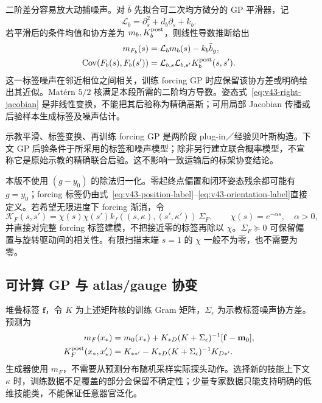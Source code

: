 \documentclass[11pt,a4paper]{article}
\numberwithin{equation}{section}
\theoremstyle{definition}
\begin{document}
二阶差分容易放大动捕噪声。对 $\bar b$ 先拟合可二次均方微分的 GP 平滑器，记
\begin{equation}
 \mathcal L_b=\partial_s^2+d_b\partial_s+k_b.
\end{equation}
若平滑后的条件均值和协方差为 $m_b,K_b^{\rm post}$，则线性导数推断给出
\begin{align}
 m_{F_b}(s)&=\mathcal L_bm_b(s)-k_b\bar b_g,\\
 \operatorname{Cov}(F_b(s),F_b(s'))
 &=\mathcal L_{b,s}\mathcal L_{b,s'}K_b^{\rm post}(s,s').
 \label{eq:v43-derivative-noise}
\end{align}
这一标签噪声在邻近相位之间相关，训练 forcing GP 时应保留该协方差或明确给出其近似。Mat\'ern $5/2$ 核满足本段所需的二阶均方导数。姿态式~\eqref{eq:v43-right-jacobian} 是非线性变换，不能把其后验称为精确高斯；可用局部 Jacobian 传播或后验样本生成标签及噪声估计。

示教平滑、标签变换、再训练 forcing GP 是两阶段 plug-in／经验贝叶斯构造。下文 GP 后验条件于所采用的标签和噪声模型；除非另行建立联合概率模型，不宣称它是原始示教的精确联合后验。这不影响一致运输后的标架协变结论。

本版不使用 $(g-y_0)$ 的除法归一化。零起终点偏置和闭环姿态残余都可能有 $g=y_0$；forcing 标签仍由式~\eqref{eq:v43-position-label}--\eqref{eq:v43-orientation-label}直接定义。若希望无限进度下 forcing 渐消，令
\begin{equation}
 \mathcal K_F(s,s')=\chi(s)\chi(s')k_f((s,\kappa),(s',\kappa'))\,\Sigma_F,
 \qquad \chi(s)=e^{-\alpha s},\quad\alpha>0,
 \label{eq:v43-gated-kernel}
\end{equation}
并直接对完整 forcing 标签建模，不把接近零的标签再除以 $\chi$。$\Sigma_F\succeq0$ 可保留偏置与旋转驱动间的相关性。有限扫描末端 $s=1$ 的 $\chi$ 一般不为零，也不需要为零。

\subsection{可计算 GP 与 atlas/gauge 协变}
堆叠标签 $\mathbf f$，令 $K$ 为上述矩阵核的训练 Gram 矩阵，$\Sigma_\epsilon$ 为示教标签噪声协方差。预测为
\begin{align}
 m_F(x_*)&=m_0(x_*)+K_{*D}(K+\Sigma_\epsilon)^{-1}
                         [\mathbf f-\mathbf m_0],\\
 K_F^{\rm post}(x_*,x_*')&=K_{**'}-
     K_{*D}(K+\Sigma_\epsilon)^{-1}K_{D*'}.
 \label{eq:v43-forcing-gp}
\end{align}
生成器使用 $m_F$，不需要从预测分布随机采样实际探头动作。选择新的技能上下文 $\kappa$ 时，训练数据不足覆盖的部分会保留不确定性；少量专家数据只能支持明确的低维技能类，不能保证任意器官泛化。
\end{document}

